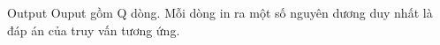 Output  
Ouput gồm Q dòng. Mỗi dòng in ra một số nguyên dương duy nhất là đáp án của truy vấn tương ứng.
